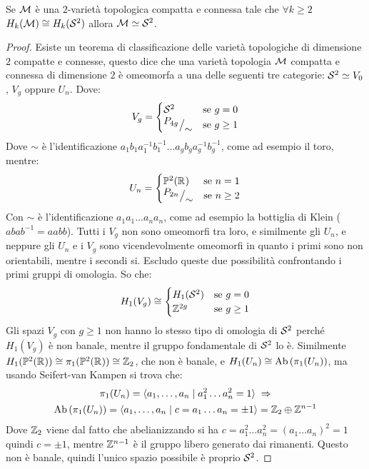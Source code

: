 \begin{proposition}
  Se $ \mathcal{M} $ è una $ 2 $-varietà topologica compatta e connessa tale che $ \forall k \geq 2 $
  $ H_k(\mathcal{M}) \cong H_k(\mathcal{S}^{2}) $ allora $ \mathcal{M} \simeq \mathcal{S}^{2} $.
\end{proposition}
\begin{proof}
  Esiste un teorema di classificazione delle varietà topologiche di dimensione
  $ 2 $ compatte e connesse, questo dice che una varietà topologia $ \mathcal{M} $
  compatta e connessa di dimensione $ 2 $ è omeomorfa a una delle seguenti tre
  categorie: $ \mathcal{S}^{2} \simeq V_0 $, $ V_g $ oppure $ U_n $. Dove:
  \[
    V_g =
    \begin{cases}
      \mathcal{S}^{2} & \text{se } g = 0 \\
      {^{\textstyle P_{4g}}\big/_{\textstyle \sim}} & \text{se } g \geq 1
    \end{cases}
  \]
  Dove $ \sim $ è l'identificazione $ a_1 b_1 a_1^{-1}b_1^{-1}\dots a_g b_g a_g^{-1}b_g^{-1} $,
  come ad esempio il toro, mentre:
  \[
    U_n =
    \begin{cases}
      \mathbb{P}^2(\mathbb{R}^{}) & \text{se } n = 1 \\
      {^{\textstyle P_{2n}}\big/_{\textstyle \sim}} & \text{se } n \geq 2
    \end{cases}
  \]
  Con $ \sim $ è l'identificazione $ a_1 a_1 \dots a_n a_n $, come ad esempio la
  bottiglia di Klein ($ abab^{-1} = aabb $). Tutti i $ V_g $ non sono omeomorfi
  tra loro, e similmente gli $ U_n $, e neppure gli $ U_n $ e i $ V_g $ sono
  vicendevolmente omeomorfi in quanto i primi sono non orientabili, mentre i
  secondi si. Escludo queste due possibilità confrontando i primi gruppi di
  omologia. So che:
  \[
    H_1(V_g) \cong
    \begin{cases}
      H_1(\mathcal{S}^{2}) & \text{se } g = 0 \\
      \mathbb{Z}^{2g} & \text{se } g \geq 1
    \end{cases}
  \]
  Gli spazi $ V_g $ con $ g \geq 1 $ non hanno lo stesso tipo di omologia di
  $ \mathcal{S}^{2} $ perché $ H_1(V_g) $ è non banale, mentre il gruppo fondamentale di
  $ \mathcal{S}^{2} $ lo è. Similmente
  $ H_1(\mathbb{P}^2(\mathbb{R}^{})) \cong \pi_1(\mathbb{P}^2(\mathbb{R}^{})) \cong \mathbb{Z}_2 $, che non è
  banale, e $ H_1(U_n) \cong \mathrm{Ab}\left( \pi_1(U_n) \right) $, ma usando Seifert-van Kampen si trova che:
  \begin{gather*}
    \pi_1(U_n) = \langle a_1, \dots, a_n \; | \; a_1^2\dots a_n^2 = 1 \rangle \; \Rightarrow \\
    \mathrm{Ab}\left( \pi_1(U_n) \right) = \langle a_1, \dots, a_n \; | \;  c = a_1 \dots a_n = \pm 1 \rangle = \mathbb{Z}_2 \oplus \mathbb{Z}^{n-1}
  \end{gather*}
  Dove $ \mathbb{Z}_2 $ viene dal fatto che abelianizzando si ha
  $ c = a_1^2\dots a_n^2 = (a_1 \dots a_n)^2 = 1 $ quindi $ c = \pm 1 $, mentre
  $ \mathbb{Z}^{n-1} $ è il gruppo libero generato dai rimanenti. Questo non è banale,
  quindi l'unico spazio possibile è proprio $ \mathcal{S}^{2} $.
\end{proof}
